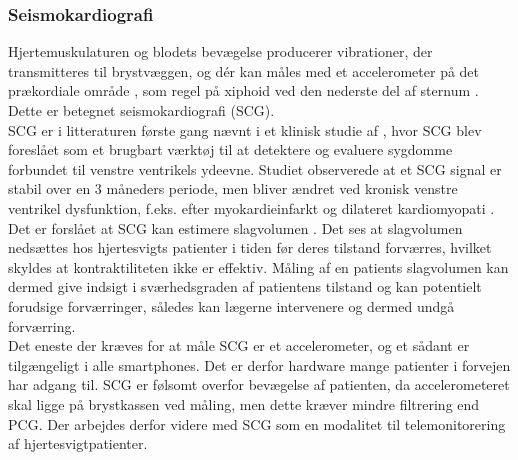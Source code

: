 \subsubsection{Seismokardiografi}
Hjertemuskulaturen og blodets bevægelse producerer vibrationer, der transmitteres til brystvæggen, og dér kan måles med et accelerometer på det prækordiale område \citep{inan2015}\citep{Salerno1990}, som regel på xiphoid ved den nederste del af sternum \citep{di2013wearable}. Dette er betegnet seismokardiografi (SCG).\\
SCG er i litteraturen første gang nævnt i et klinisk studie af \citet{Salerno1990}, hvor SCG blev foreslået som et brugbart værktøj til at detektere og evaluere sygdomme forbundet til venstre ventrikels ydeevne. Studiet observerede at et SCG signal er stabil over en 3 måneders periode, men bliver ændret ved kronisk venstre ventrikel dysfunktion, f.eks. efter myokardieinfarkt og dilateret kardiomyopati \citep{Salerno1990}.\\
Det er forslået at SCG kan estimere slagvolumen \citep{McKay1999}. Det ses at slagvolumen nedsættes hos hjertesvigts patienter i tiden før deres tilstand forværres, hvilket skyldes at kontraktiliteten ikke er effektiv. Måling af en patients slagvolumen kan dermed give indsigt i sværhedsgraden af patientens tilstand og kan potentielt forudsige forværringer, således kan lægerne intervenere og dermed undgå forværring. \citep{Ashouri2016}\\
Det eneste der kræves for at måle SCG er et accelerometer, og et sådant er tilgængeligt i alle smartphones. Det er derfor hardware mange patienter i forvejen har adgang til. SCG er følsomt overfor bevægelse af patienten, da accelerometeret skal ligge på brystkassen ved måling, men dette kræver mindre filtrering end PCG. Der arbejdes derfor videre med SCG som en modalitet til telemonitorering af hjertesvigtpatienter.

